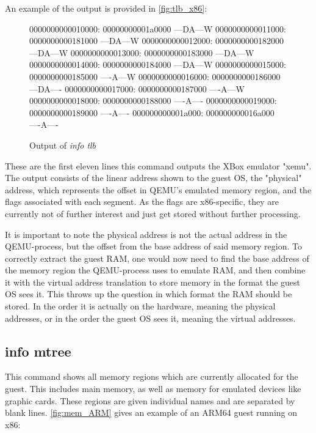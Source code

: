 An example of the output is provided in \autoref{fig:tlb_x86}:

\begin{figure}[H]
\begin{ffcode}
    0000000000010000: 00000000001a0000 ---DA---W
    0000000000011000: 0000000000181000 ---DA---W
    0000000000012000: 0000000000182000 ---DA---W
    0000000000013000: 0000000000183000 ---DA---W
    0000000000014000: 0000000000184000 ---DA---W
    0000000000015000: 0000000000185000 ----A---W
    0000000000016000: 0000000000186000 ---DA----
    0000000000017000: 0000000000187000 ----A---W
    0000000000018000: 0000000000188000 ----A----
    0000000000019000: 0000000000189000 ----A----
    000000000001a000: 000000000016a000 ----A----
\end{ffcode}
\caption{Output of \emph{info tlb}}
\label{fig:tlb_x86}
\end{figure}

These are the first eleven lines this command outputs the XBox emulator "xemu"\cite{xemu}.
The output consists of the linear address shown to the guest OS, the "physical" address, which represents the offset in QEMU's emulated memory region,
and the flags associated with each segment.
As the flags are x86-specific, they are currently not of further interest and just get stored without further processing.

It is important to note the physical address is not the actual address in the QEMU-process, but the offset from the base address of said memory region.
To correctly extract the guest RAM, one would now need to find the base address of the memory region the QEMU-process uses to emulate RAM,
and then combine it with the virtual address translation to store memory in the format the guest OS sees it.
This throws up the question in which format the RAM should be stored. In the order it is actually on the hardware, meaning the physical addresses,
or in the order the guest OS sees it, meaning the virtual addresses.

\subsection{info mtree}
This command shows all memory regions which are currently allocated for the guest.
This includes main memory, as well as memory for emulated devices like graphic cards.
These regions are given individual names and are separated by blank lines.
\autoref{fig:mem_ARM} gives an example of an ARM64 guest running on x86:

